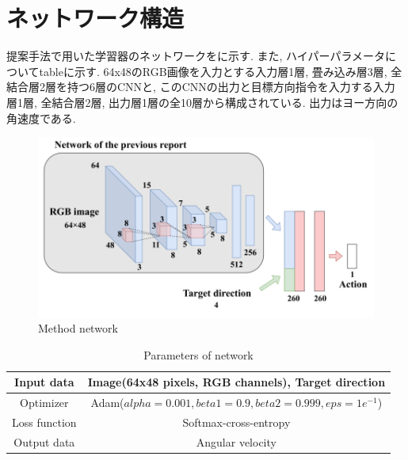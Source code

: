 
\section{ネットワーク構造}
提案手法で用いた学習器のネットワークをに示す. また, ハイパーパラメータについてtableに示す. 64x48のRGB画像を入力とする入力層1層, 畳み込み層3層, 全結合層2層を持つ6層のCNNと, このCNNの出力と目標方向指令を入力する入力層1層, 全結合層2層, 出力層1層の全10層から構成されている. 出力はヨー方向の角速度である.

\begin{figure}[hbtp]
  \centering
 \includegraphics[keepaspectratio, scale=0.4]
      {images/network_structure.png}
 \caption{Method network}
 \label{Fig:network_structure}
\end{figure}

\begin{table}[hbtp]
  \caption{Parameters of network}
  \label{table:param1}
  \centering
  \begin{tabular}{|c|c|}
    \hline
    Input data & Image(64x48 pixels, RGB channels), Target direction \\
    \hline
    Optimizer & Adam($alpha = 0.001, beta1 = 0.9, beta2 =  0.999, eps = 1e^{-1}$)\\
    \hline
    Loss function & Softmax-cross-entropy\\
    \hline
    Output data & Angular velocity\\
    \hline
  \end{tabular}
\end{table}


\newpage
